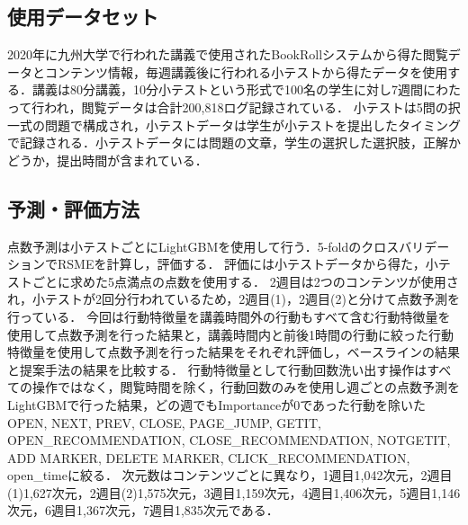 \documentclass[platex,dvipdfmx,a4paper,twocolumn,base=10pt,jbase=10pt,ja=standard]{bxjsarticle}
\begin{document}
\subsection{使用データセット}

2020年に九州大学で行われた講義で使用されたBookRollシステムから得た閲覧データとコンテンツ情報，毎週講義後に行われる小テストから得たデータを使用する．講義は80分講義，10分小テストという形式で100名の学生に対し7週間にわたって行われ，閲覧データは合計200,818ログ記録されている．
小テストは5問の択一式の問題で構成され，小テストデータは学生が小テストを提出したタイミングで記録される．小テストデータには問題の文章，学生の選択した選択肢，正解かどうか，提出時間が含まれている．



\subsection{予測・評価方法}

点数予測は小テストごとにLightGBMを使用して行う．5-foldのクロスバリデーションでRSMEを計算し，評価する．
評価には小テストデータから得た，小テストごとに求めた5点満点の点数を使用する．
2週目は2つのコンテンツが使用され，小テストが2回分行われているため，2週目(1)，2週目(2)と分けて点数予測を行っている．
今回は行動特徴量を講義時間外の行動もすべて含む行動特徴量を使用して点数予測を行った結果と，講義時間内と前後1時間の行動に絞った行動特徴量を使用して点数予測を行った結果をそれぞれ評価し，ベースラインの結果と提案手法の結果を比較する．
行動特徴量として行動回数洗い出す操作はすべての操作ではなく，閲覧時間を除く，行動回数のみを使用し週ごとの点数予測をLightGBMで行った結果，どの週でもImportanceが0であった行動を除いたOPEN, NEXT, PREV, CLOSE, PAGE\_JUMP, GETIT, OPEN\_RECOMMENDATION, CLOSE\_RECOMMENDATION, NOTGETIT, ADD MARKER, DELETE MARKER, CLICK\_RECOMMENDATION, open\_timeに絞る．
次元数はコンテンツごとに異なり，1週目1,042次元，2週目(1)1,627次元，2週目(2)1,575次元，3週目1,159次元，4週目1,406次元，5週目1,146次元，6週目1,367次元，7週目1,835次元である．




\end{document}
